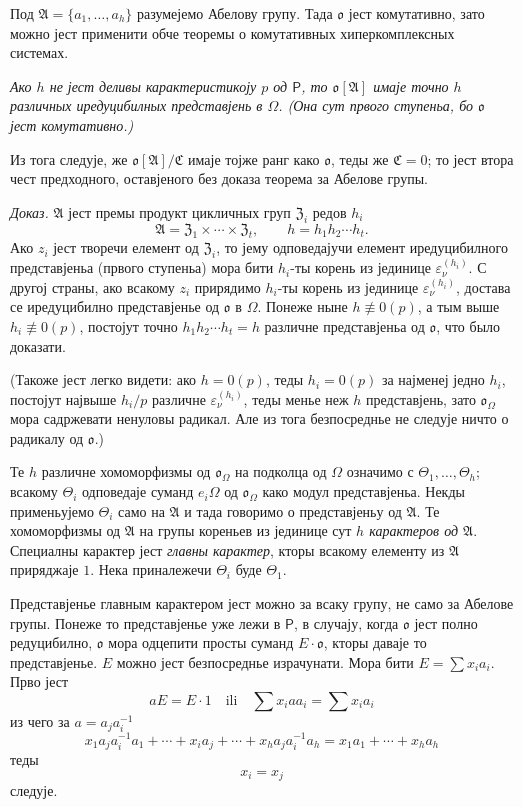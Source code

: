 \documentclass[11pt]{article}
\begin{document}
Под \(\mathfrak A=\{a_1,\ldots,a_h\}\) разумејемо Абелову групу. Тада \(\mathfrak o\) јест комутативно, зато можно јест применити обче теоремы о комутативных хиперкомплексных системах.

\emph{Ако \(h\) не јест деливы карактеристикоју \(p\) од \(\mathsf P\), то \(\mathfrak o[\mathfrak A]\) имаје точно \(h\) различных иредуцибилных представјень в \(\Omega\). (Она сут првого ступеньа, бо \(\mathfrak o\) јест комутативно.)}

Из тога следује, же \(\mathfrak o[\mathfrak A]/\mathfrak C\) имаје тојже ранг како \(\mathfrak o\), теды же \(\mathfrak C=0\); то јест втора чест предходного, оставјеного без доказа теорема за Абелове групы.

\emph{Доказ.} \(\mathfrak A\) јест премы продукт цикличных груп \(\mathfrak Z_i\) редов \(h_i\)
\[
\mathfrak A=\mathfrak Z_1\times\cdots\times\mathfrak Z_t,\qquad
h=h_1h_2\cdots h_t .
\]
Ако \(z_i\) јест творечи елемент од \(\mathfrak Z_i\), то јему одповедајучи елемент иредуцибилного представјеньа (првого ступеньа) мора бити \(h_i\)-ты корень из јединице \(\varepsilon_\nu^{(h_i)}\). С другој страны, ако всакому \(z_i\) прирядимо \(h_i\)-ты корень из јединице \(\varepsilon_\nu^{(h_i)}\), достава се иредуцибилно представјенье од \(\mathfrak o\) в \(\Omega\). Понеже ныне \(h\not\equiv0(p)\), а тым выше \(h_i\not\equiv0(p)\), постојут точно \(h_1h_2\cdots h_t=h\) различне представјеньа од \(\mathfrak o\), что было доказати.

(Такоже јест легко видети: ако \(h=0(p)\), теды \(h_i=0(p)\) за најменеј једно \(h_i\), постојут највыше \(h_i/p\) различне \(\varepsilon_\nu^{(h_i)}\), теды менье неж \(h\) представјень, зато \(\mathfrak o_\Omega\) мора садржевати ненуловы радикал. Але из тога безпосреднье не следује ничто о радикалу од \(\mathfrak o\).)

Те \(h\) различне хомоморфизмы од \(\mathfrak o_\Omega\) на подколца од \(\Omega\) означимо с \(\Theta_1,\ldots,\Theta_h\); всакому \(\Theta_i\) одповедаје суманд \(e_i\Omega\) од \(\mathfrak o_\Omega\) како модул представјеньа. Некды применьујемо \(\Theta_i\) само на \(\mathfrak A\) и тада говоримо о представјеньу од \(\mathfrak A\). Те хомоморфизмы од \(\mathfrak A\) на групы кореньев из јединице сут \emph{\(h\) карактеров од \(\mathfrak A\)}. Специалны карактер јест \emph{главны карактер}, кторы всакому елементу из \(\mathfrak A\) приряджаје \(1\). Нека приналежечи \(\Theta_i\) буде \(\Theta_1\).

Представјенье главным карактером јест можно за всаку групу, не само за Абелове групы. Понеже то представјенье уже лежи в \(\mathsf P\), в случају, когда \(\mathfrak o\) јест полно редуцибилно, \(\mathfrak o\) мора одцепити просты суманд \(E\cdot\mathfrak o\), кторы даваје то представјенье. \(E\) можно јест безпосреднье израчунати. Мора бити \(E=\sum x_i a_i\). Прво јест
\[
aE=E\cdot 1\quad\text{ili}\quad \sum x_i a a_i=\sum x_i a_i
\]
из чего за \(a=a_j a_i^{-1}\)
\[
x_1a_ja_i^{-1}a_1+\cdots+x_i a_j+\cdots+x_ha_ja_i^{-1}a_h
=x_1a_1+\cdots+x_ha_h
\]
теды
\[
x_i=x_j
\]
следује.
\end{document}
